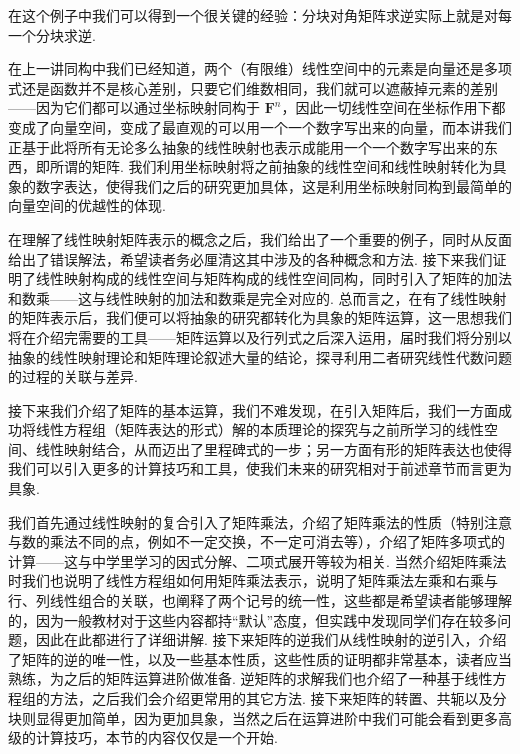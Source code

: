 在这个例子中我们可以得到一个很关键的经验：分块对角矩阵求逆实际上就是对每一个分块求逆.

\begin{summary}

    在上一讲同构中我们已经知道，两个（有限维）线性空间中的元素是向量还是多项式还是函数并不是核心差别，只要它们维数相同，我们就可以遮蔽掉元素的差别——因为它们都可以通过坐标映射同构于 $\mathbf{F}^n$，因此一切线性空间在坐标作用下都变成了向量空间，变成了最直观的可以用一个一个数字写出来的向量，而本讲我们正基于此将所有无论多么抽象的线性映射也表示成能用一个一个数字写出来的东西，即所谓的矩阵. 我们利用坐标映射将之前抽象的线性空间和线性映射转化为具象的数字表达，使得我们之后的研究更加具体，这是利用坐标映射同构到最简单的向量空间的优越性的体现.

    在理解了线性映射矩阵表示的概念之后，我们给出了一个重要的例子，同时从反面给出了错误解法，希望读者务必厘清这其中涉及的各种概念和方法. 接下来我们证明了线性映射构成的线性空间与矩阵构成的线性空间同构，同时引入了矩阵的加法和数乘——这与线性映射的加法和数乘是完全对应的. 总而言之，在有了线性映射的矩阵表示后，我们便可以将抽象的研究都转化为具象的矩阵运算，这一思想我们将在介绍完需要的工具——矩阵运算以及行列式之后深入运用，届时我们将分别以抽象的线性映射理论和矩阵理论叙述大量的结论，探寻利用二者研究线性代数问题的过程的关联与差异.

    接下来我们介绍了矩阵的基本运算，我们不难发现，在引入矩阵后，我们一方面成功将线性方程组（矩阵表达的形式）解的本质理论的探究与之前所学习的线性空间、线性映射结合，从而迈出了里程碑式的一步；另一方面有形的矩阵表达也使得我们可以引入更多的计算技巧和工具，使我们未来的研究相对于前述章节而言更为具象.

    我们首先通过线性映射的复合引入了矩阵乘法，介绍了矩阵乘法的性质（特别注意与数的乘法不同的点，例如不一定交换，不一定可消去等），介绍了矩阵多项式的计算——这与中学里学习的因式分解、二项式展开等较为相关. 当然介绍矩阵乘法时我们也说明了线性方程组如何用矩阵乘法表示，说明了矩阵乘法左乘和右乘与行、列线性组合的关联，也阐释了两个记号的统一性，这些都是希望读者能够理解的，因为一般教材对于这些内容都持``默认''态度，但实践中发现同学们存在较多问题，因此在此都进行了详细讲解. 接下来矩阵的逆我们从线性映射的逆引入，介绍了矩阵的逆的唯一性，以及一些基本性质，这些性质的证明都非常基本，读者应当熟练，为之后的矩阵运算进阶做准备. 逆矩阵的求解我们也介绍了一种基于线性方程组的方法，之后我们会介绍更常用的其它方法. 接下来矩阵的转置、共轭以及分块则显得更加简单，因为更加具象，当然之后在运算进阶中我们可能会看到更多高级的计算技巧，本节的内容仅仅是一个开始.
\end{summary}

